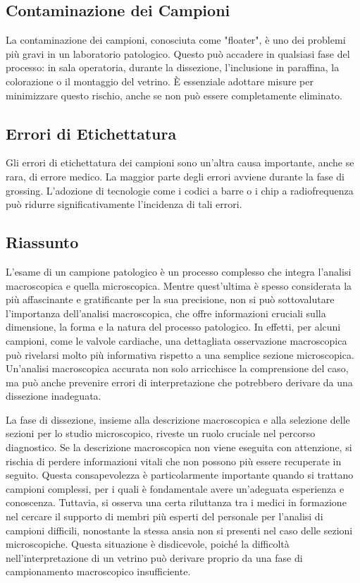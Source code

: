 \subsection{Contaminazione dei Campioni}
La contaminazione dei campioni, conosciuta come "floater", è uno dei problemi più gravi in un laboratorio patologico. Questo può accadere in qualsiasi fase del processo: in sala operatoria, durante la dissezione, l'inclusione in paraffina, la colorazione o il montaggio del vetrino. È essenziale adottare misure per minimizzare questo rischio, anche se non può essere completamente eliminato.

\subsection{Errori di Etichettatura}
Gli errori di etichettatura dei campioni sono un'altra causa importante, anche se rara, di errore medico. La maggior parte degli errori avviene durante la fase di grossing. L'adozione di tecnologie come i codici a barre o i chip a radiofrequenza può ridurre significativamente l'incidenza di tali errori.

\subsection{Riassunto}
L'esame di un campione patologico è un processo complesso che integra l'analisi macroscopica e quella microscopica. Mentre quest'ultima è spesso considerata la più affascinante e gratificante per la sua precisione, non si può sottovalutare l'importanza dell'analisi macroscopica, che offre informazioni cruciali sulla dimensione, la forma e la natura del processo patologico. In effetti, per alcuni campioni, come le valvole cardiache, una dettagliata osservazione macroscopica può rivelarsi molto più informativa rispetto a una semplice sezione microscopica. Un’analisi macroscopica accurata non solo arricchisce la comprensione del caso, ma può anche prevenire errori di interpretazione che potrebbero derivare da una dissezione inadeguata.

La fase di dissezione, insieme alla descrizione macroscopica e alla selezione delle sezioni per lo studio microscopico, riveste un ruolo cruciale nel percorso diagnostico. Se la descrizione macroscopica non viene eseguita con attenzione, si rischia di perdere informazioni vitali che non possono più essere recuperate in seguito. Questa consapevolezza è particolarmente importante quando si trattano campioni complessi, per i quali è fondamentale avere un’adeguata esperienza e conoscenza. Tuttavia, si osserva una certa riluttanza tra i medici in formazione nel cercare il supporto di membri più esperti del personale per l'analisi di campioni difficili, nonostante la stessa ansia non si presenti nel caso delle sezioni microscopiche. Questa situazione è disdicevole, poiché la difficoltà nell'interpretazione di un vetrino può derivare proprio da una fase di campionamento macroscopico insufficiente.

